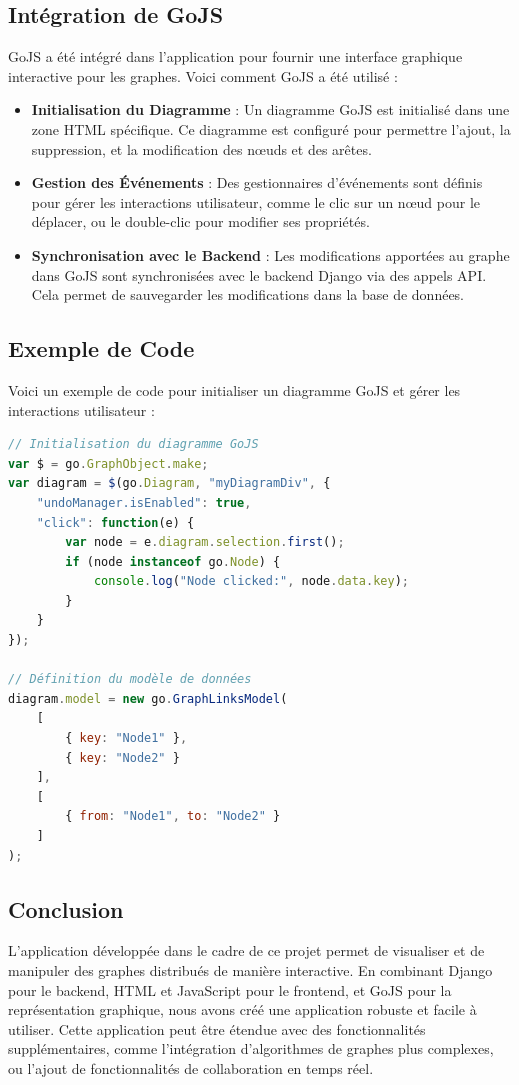 \documentclass[a4paper,12pt]{article}
\begin{document}
\subsection{Intégration de GoJS}
GoJS a été intégré dans l'application pour fournir une interface graphique interactive pour les graphes. Voici comment GoJS a été utilisé :

\begin{itemize}
    \item \textbf{Initialisation du Diagramme} : Un diagramme GoJS est initialisé dans une zone HTML spécifique. Ce diagramme est configuré pour permettre l'ajout, la suppression, et la modification des nœuds et des arêtes.
    \item \textbf{Gestion des Événements} : Des gestionnaires d'événements sont définis pour gérer les interactions utilisateur, comme le clic sur un nœud pour le déplacer, ou le double-clic pour modifier ses propriétés.
    \item \textbf{Synchronisation avec le Backend} : Les modifications apportées au graphe dans GoJS sont synchronisées avec le backend Django via des appels API. Cela permet de sauvegarder les modifications dans la base de données.
\end{itemize}

\subsection{Exemple de Code}
Voici un exemple de code pour initialiser un diagramme GoJS et gérer les interactions utilisateur :

\begin{lstlisting}[language=JavaScript]
// Initialisation du diagramme GoJS
var $ = go.GraphObject.make;
var diagram = $(go.Diagram, "myDiagramDiv", {
    "undoManager.isEnabled": true,
    "click": function(e) {
        var node = e.diagram.selection.first();
        if (node instanceof go.Node) {
            console.log("Node clicked:", node.data.key);
        }
    }
});

// Définition du modèle de données
diagram.model = new go.GraphLinksModel(
    [
        { key: "Node1" },
        { key: "Node2" }
    ],
    [
        { from: "Node1", to: "Node2" }
    ]
);
\end{lstlisting}

\subsection{Conclusion}
L'application développée dans le cadre de ce projet permet de visualiser et de manipuler des graphes distribués de manière interactive. En combinant Django pour le backend, HTML et JavaScript pour le frontend, et GoJS pour la représentation graphique, nous avons créé une application robuste et facile à utiliser. Cette application peut être étendue avec des fonctionnalités supplémentaires, comme l'intégration d'algorithmes de graphes plus complexes, ou l'ajout de fonctionnalités de collaboration en temps réel.
\end{document}
